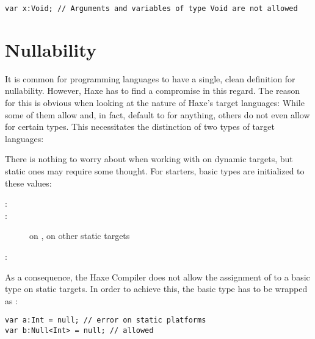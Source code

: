 \begin{lstlisting}
var x:Void; // Arguments and variables of type Void are not allowed
\end{lstlisting}



\section{Nullability}
\label{types-nullability}


It is common for programming languages to have a single, clean definition for nullability. However, Haxe has to find a compromise in this regard. The reason for this is obvious when looking at the nature of Haxe's target languages: While some of them allow and, in fact, default to  for anything, others do not even allow  for certain types. This necessitates the distinction of two types of target languages:



There is nothing to worry about when working with  on dynamic targets, but static ones may require some thought. For starters, basic types are initialized to these values:

\begin{description}
	\item[:] 
	\item[:]  on ,  on other static targets
	\item[:] 
\end{description}

As a consequence, the Haxe Compiler does not allow the assignment of  to a basic type on static targets. In order to achieve this, the basic type has to be wrapped as :

\begin{lstlisting}
var a:Int = null; // error on static platforms
var b:Null<Int> = null; // allowed
\end{lstlisting}

